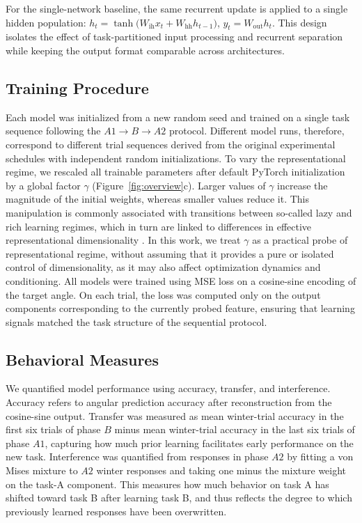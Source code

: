 \documentclass[letterpaper]{article}
\begin{document}
        For the single-network baseline, the same recurrent update is applied to a single hidden population:        $h_t = \tanh\!\big(W_{\mathrm{ih}} x_t + W_{\mathrm{hh}} h_{t-1}\big)$, $y_t = W_{\mathrm{out}} h_t$. This design isolates the effect of task-partitioned input processing and recurrent separation while keeping the output format comparable across architectures.
        
        \subsection{Training Procedure}
        
        Each model was initialized from a new random seed and trained on a single task sequence following the $A1 \rightarrow B \rightarrow A2$ protocol. Different model runs, therefore, correspond to different trial sequences derived from the original experimental schedules with independent random initializations. To vary the representational regime, we rescaled all trainable parameters after default PyTorch initialization by a global factor $\gamma$ (Figure~\ref{fig:overview}c). Larger values of $\gamma$ increase the magnitude of the initial weights, whereas smaller values reduce it. This manipulation is commonly associated with transitions between so-called lazy and rich learning regimes, which in turn are linked to differences in effective representational dimensionality \cite{flesch2021rich}. In this work, we treat $\gamma$ as a practical probe of representational regime, without assuming that it provides a pure or isolated control of dimensionality, as it may also affect optimization dynamics and conditioning. All models were trained using MSE loss on a cosine-sine encoding of the target angle. On each trial, the loss was computed only on the output components corresponding to the currently probed feature, ensuring that learning signals matched the task structure of the sequential protocol. %
        
        \subsection{Behavioral Measures}

        We quantified model performance using accuracy, transfer, and interference. Accuracy refers to angular prediction accuracy after reconstruction from the cosine-sine output. Transfer was measured as mean winter-trial accuracy in the first six trials of phase \(B\) minus mean winter-trial accuracy in the last six trials of phase \(A1\), capturing how much prior learning facilitates early performance on the new task. Interference was quantified from responses in phase \(A2\) by fitting a von Mises mixture to $A2$ winter responses and taking one minus the mixture weight on the task-A component. This measures how much behavior on task A has shifted toward task B after learning task B, and thus reflects the degree to which previously learned responses have been overwritten.
        
\end{document}

